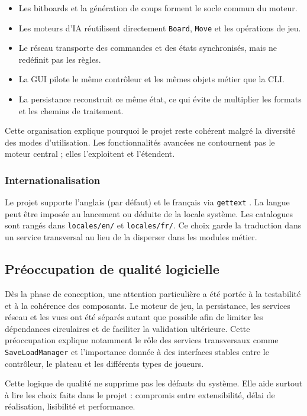 \documentclass[a4paper]{article}
\begin{document}
\begin{itemize}
    \item Les bitboards et la génération de coups forment le socle commun du moteur.
    \item Les moteurs d'IA réutilisent directement \texttt{Board}, \texttt{Move} et les opérations de jeu.
    \item Le réseau transporte des commandes et des états synchronisés, mais ne redéfinit pas les règles.
    \item La GUI pilote le même contrôleur et les mêmes objets métier que la CLI.
    \item La persistance reconstruit ce même état, ce qui évite de multiplier les formats et les chemins de traitement.
\end{itemize}

Cette organisation explique pourquoi le projet reste cohérent malgré la diversité des modes d'utilisation. Les fonctionnalités avancées ne contournent pas le moteur central ; elles l'exploitent et l'étendent.

\subsubsection{Internationalisation}

Le projet supporte l'anglais (par défaut) et le français via \texttt{gettext} \cite{gettext2024}. La langue peut être imposée au lancement ou déduite de la locale système. Les catalogues sont rangés dans \texttt{locales/en/} et \texttt{locales/fr/}. Ce choix garde la traduction dans un service transversal au lieu de la disperser dans les modules métier.

\subsection{Préoccupation de qualité logicielle}

Dès la phase de conception, une attention particulière a été portée à la testabilité et à la cohérence des composants. Le moteur de jeu, la persistance, les services réseau et les vues ont été séparés autant que possible afin de limiter les dépendances circulaires et de faciliter la validation ultérieure. Cette préoccupation explique notamment le rôle des services transversaux comme \texttt{SaveLoadManager} et l'importance donnée à des interfaces stables entre le contrôleur, le plateau et les différents types de joueurs.

Cette logique de qualité ne supprime pas les défauts du système. Elle aide surtout à lire les choix faits dans le projet : compromis entre extensibilité, délai de réalisation, lisibilité et performance.
\end{document}
